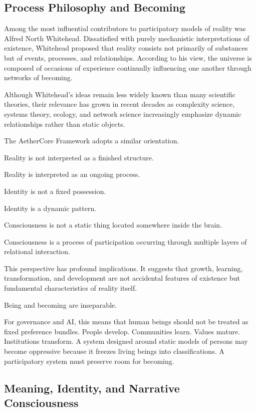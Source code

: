 \documentclass[12pt]{article}
\begin{document}
\subsection{Process Philosophy and Becoming}

Among the most influential contributors to participatory models of reality was Alfred North Whitehead. Dissatisfied with purely mechanistic interpretations of existence, Whitehead proposed that reality consists not primarily of substances but of events, processes, and relationships. According to his view, the universe is composed of occasions of experience continually influencing one another through networks of becoming.

Although Whitehead's ideas remain less widely known than many scientific theories, their relevance has grown in recent decades as complexity science, systems theory, ecology, and network science increasingly emphasize dynamic relationships rather than static objects.

The AetherCore Framework adopts a similar orientation.

Reality is not interpreted as a finished structure.

Reality is interpreted as an ongoing process.

Identity is not a fixed possession.

Identity is a dynamic pattern.

Consciousness is not a static thing located somewhere inside the brain.

Consciousness is a process of participation occurring through multiple layers of relational interaction.

This perspective has profound implications. It suggests that growth, learning, transformation, and development are not accidental features of existence but fundamental characteristics of reality itself.

Being and becoming are inseparable.

For governance and AI, this means that human beings should not be treated as fixed preference bundles. People develop. Communities learn. Values mature. Institutions transform. A system designed around static models of persons may become oppressive because it freezes living beings into classifications. A participatory system must preserve room for becoming.

\subsection{Meaning, Identity, and Narrative Consciousness}
\end{document}
